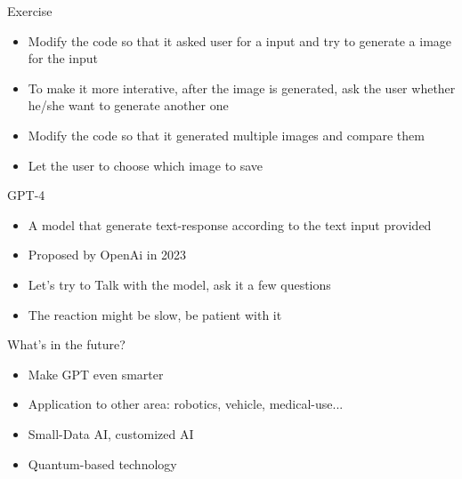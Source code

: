 \documentclass[10pt,xcolor={table,dvipsnames},t]{beamer}
\begin{document}
\begin{frame}{Exercise}
  \begin{itemize}
    \item Modify the code so that it asked user for a input and try to generate a image for the input
    \item To make it more interative, after the image is generated, ask the user whether he/she want to generate another one
    \item Modify the code so that it generated multiple images and compare them
    \item Let the user to choose which image to save
  \end{itemize}
\end{frame}

\begin{frame}{GPT-4}
  \begin{itemize}
    \item A model that generate text-response according to the text input provided
    \item Proposed by OpenAi in 2023
    \item Let's try to Talk with the model, ask it a few questions
    \item The reaction might be slow, be patient with it
  \end{itemize}
\end{frame}

\begin{frame}{What's in the future?}
  \begin{itemize}
    \item Make GPT even smarter
    \item Application to other area: robotics, vehicle, medical-use...
    \item Small-Data AI, customized AI
    \item Quantum-based technology
  \end{itemize}
\end{frame}
\end{document}
